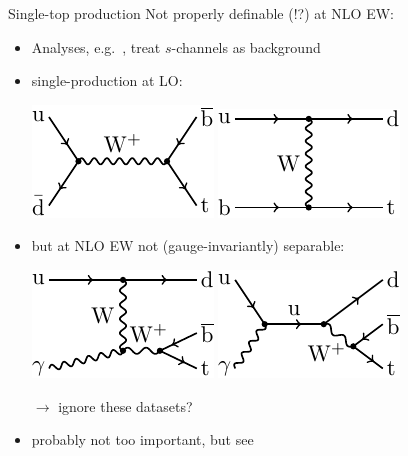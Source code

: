 \begin{frame}{Single-top production}
\fontsize{9}{11}\selectfont
Not properly definable (!?) at NLO EW:
\begin{itemize}
\item Analyses, e.g.\ , treat $s$-channels as background
\item single-production at LO:
\begin{center}
\includegraphics{ew_corrections/figures/fd10_born_s_channel_top}\hspace{0.4cm}
\includegraphics{ew_corrections/figures/fd11_born_t_channel_top}
\end{center}
\item but at NLO EW not (gauge-invariantly) separable:
\begin{center}
\includegraphics{ew_corrections/figures/fd12_real_ts_channel_top}\hspace{0.4cm}
\includegraphics{ew_corrections/figures/fd13_real_s_channel_top}
\end{center}
\item[$\rightarrow$] ignore these datasets?
\item probably not too important, but see 
\end{itemize}
\end{frame}

